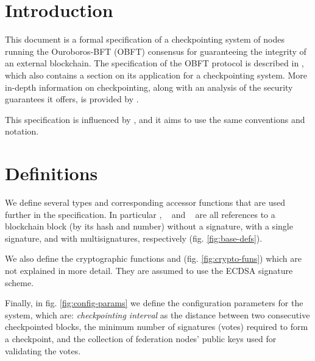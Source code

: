 \section{Introduction}

This document is a formal specification of a checkpointing system of nodes running the Ouroboros-BFT (OBFT) consensus for guaranteeing the integrity of an external blockchain. The specification of the OBFT protocol is described in \cite{obft-paper}, which also contains a section on its application for a checkpointing system. More in-depth information on checkpointing, along with an analysis of the security guarantees it offers, is provided by \cite{chkp-paper}.

This specification is influenced by \cite{ledger-spec}, and it aims to use the same conventions and notation.


\section{Definitions}

We define several types and corresponding accessor functions that are used further in the specification. In particular \BlockRef, \Vote~ and \Chkp~ are all references to a blockchain block (by its hash and number) without a signature, with a single signature, and with multisignatures, respectively (fig. \ref{fig:base-defs}).

We also define the cryptographic functions  and  (fig. \ref{fig:crypto-funs}) which are not explained in more detail. They are assumed to use the ECDSA signature scheme.

Finally, in fig. \ref{fig:config-params} we define the configuration parameters for the system, which are: \textit{checkpointing interval} as the distance between two consecutive checkpointed blocks, the minimum number of signatures (votes) required to form a checkpoint, and the collection of federation nodes' public keys used for validating the votes.

